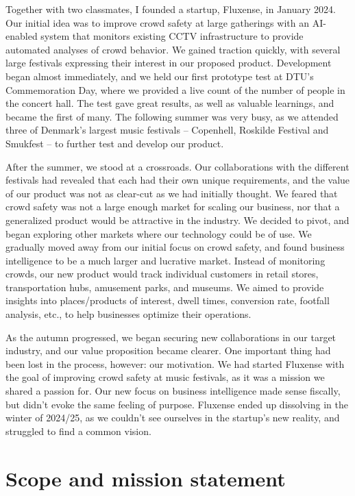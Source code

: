 Together with two classmates, I founded a startup, Fluxense, in January 2024. Our initial idea was to improve crowd safety at large gatherings with an AI-enabled system that monitors existing CCTV infrastructure to provide automated analyses of crowd behavior. We gained traction quickly, with several large festivals expressing their interest in our proposed product. Development began almost immediately, and we held our first prototype test at DTU's Commemoration Day, where we provided a live count of the number of people in the concert hall. The test gave great results, as well as valuable learnings, and became the first of many. The following summer was very busy, as we attended three of Denmark's largest music festivals -- Copenhell, Roskilde Festival and Smukfest -- to further test and develop our product.

After the summer, we stood at a crossroads. Our collaborations with the different festivals had revealed that each had their own unique requirements, and the value of our product was not as clear-cut as we had initially thought. We feared that crowd safety was not a large enough market for scaling our business, nor that a generalized product would be attractive in the industry. We decided to pivot, and began exploring other markets where our technology could be of use. We gradually moved away from our initial focus on crowd safety, and found business intelligence to be a much larger and lucrative market. Instead of monitoring crowds, our new product would track individual customers in retail stores, transportation hubs, amusement parks, and museums. We aimed to provide insights into places/products of interest, dwell times, conversion rate, footfall analysis, etc., to help businesses optimize their operations.

As the autumn progressed, we began securing new collaborations in our target industry, and our value proposition became clearer. One important thing had been lost in the process, however: our motivation. We had started Fluxense with the goal of improving crowd safety at music festivals, as it was a mission we shared a passion for. Our new focus on business intelligence made sense fiscally, but didn't evoke the same feeling of purpose. Fluxense ended up dissolving in the winter of 2024/25, as we couldn't see ourselves in the startup's new reality, and struggled to find a common vision.

\section{Scope and mission statement}

